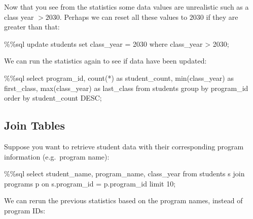 \documentclass[
  letterpaper,
]{scrbook}
\newenvironment{Shaded}{\begin{snugshade}}{\end{snugshade}}
\newcommand{\BuiltInTok}[1]{\textcolor[rgb]{0.00,0.23,0.31}{#1}}
\newcommand{\DecValTok}[1]{\textcolor[rgb]{0.68,0.00,0.00}{#1}}
\newcommand{\ImportTok}[1]{\textcolor[rgb]{0.00,0.46,0.62}{#1}}
\newcommand{\NormalTok}[1]{\textcolor[rgb]{0.00,0.23,0.31}{#1}}
\newcommand{\OperatorTok}[1]{\textcolor[rgb]{0.37,0.37,0.37}{#1}}
\begin{document}
Now that you see from the statistics some data values are unrealistic
such as a class year \(>2030\). Perhaps we can reset all these values to
\(2030\) if they are greater than that:

\begin{Shaded}
\begin{Highlighting}[]
\OperatorTok{\%\%}\NormalTok{sql}
\NormalTok{update students }\BuiltInTok{set}\NormalTok{ class\_year }\OperatorTok{=} \DecValTok{2030}\NormalTok{ where class\_year }\OperatorTok{\textgreater{}} \DecValTok{2030}\OperatorTok{;}
\end{Highlighting}
\end{Shaded}

We can run the statistics again to see if data have been updated:

\begin{Shaded}
\begin{Highlighting}[]
\OperatorTok{\%\%}\NormalTok{sql}
\NormalTok{select program\_id, }
\NormalTok{       count(}\OperatorTok{*}\NormalTok{) }\ImportTok{as}\NormalTok{ student\_count, }
       \BuiltInTok{min}\NormalTok{(class\_year) }\ImportTok{as}\NormalTok{ first\_class, }
       \BuiltInTok{max}\NormalTok{(class\_year) }\ImportTok{as}\NormalTok{ last\_class}
\ImportTok{from}\NormalTok{ students }
\NormalTok{group by program\_id}
\NormalTok{order by student\_count DESC}\OperatorTok{;}
\end{Highlighting}
\end{Shaded}

\subsection*{Join Tables}\label{join-tables}

Suppose you want to retrieve student data with their corresponding
program information (e.g.~program name):

\begin{Shaded}
\begin{Highlighting}[]
\OperatorTok{\%\%}\NormalTok{sql}
\NormalTok{select student\_name, program\_name, class\_year}
\ImportTok{from}\NormalTok{ students s join programs p on s.program\_id }\OperatorTok{=}\NormalTok{ p.program\_id}
\NormalTok{limit }\DecValTok{10}\OperatorTok{;}
\end{Highlighting}
\end{Shaded}

We can rerun the previous statistics based on the program names, instead
of program IDs:
\end{document}

